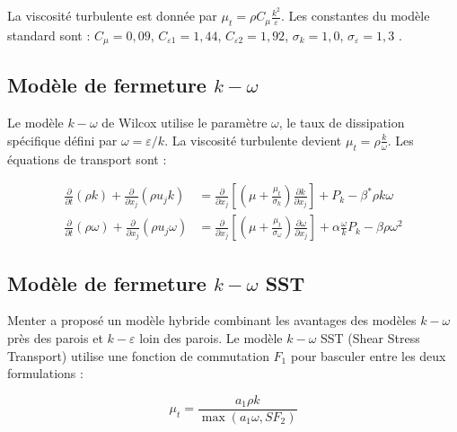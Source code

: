 La viscosité turbulente est donnée par \( \mu_t = \rho C_\mu \frac{k^2}{\varepsilon} \). Les constantes du modèle standard sont : \( C_\mu = 0,09 \), \( C_{\varepsilon 1} = 1,44 \), \( C_{\varepsilon 2} = 1,92 \), \( \sigma_k = 1,0 \), \( \sigma_\varepsilon = 1,3 \) \cite{launder1974numerical}.

\subsection{Modèle de fermeture \( k-\omega \)}
\label{subsec:modele_k_omega}

Le modèle \( k-\omega \) de Wilcox \cite{wilcox1988reassessment} utilise le paramètre \( \omega \), le taux de dissipation spécifique défini par \( \omega = \varepsilon/k \). La viscosité turbulente devient \( \mu_t = \rho \frac{k}{\omega} \). Les équations de transport sont \cite{wilcox2008formulation} :

\begin{align}
\frac{\partial}{\partial t} (\rho k) + \frac{\partial}{\partial x_j} (\rho u_j k) &= \frac{\partial}{\partial x_j} \left[ \left( \mu + \frac{\mu_t}{\sigma_k} \right) \frac{\partial k}{\partial x_j} \right] + P_k - \beta^* \rho k \omega \label{eq:transport_k_omega} \\
\frac{\partial}{\partial t} (\rho \omega) + \frac{\partial}{\partial x_j} (\rho u_j \omega) &= \frac{\partial}{\partial x_j} \left[ \left( \mu + \frac{\mu_t}{\sigma_\omega} \right) \frac{\partial \omega}{\partial x_j} \right] + \alpha \frac{\omega}{k} P_k - \beta \rho \omega^2 \label{eq:transport_omega}
\end{align}

\subsection{Modèle de fermeture \( k-\omega \) SST}
\label{subsec:modele_k_omega_sst}

Menter \cite{menter1994two} a proposé un modèle hybride combinant les avantages des modèles \( k-\omega \) près des parois et \( k-\varepsilon \) loin des parois. Le modèle \( k-\omega \) SST (Shear Stress Transport) utilise une fonction de commutation \( F_1 \) pour basculer entre les deux formulations \cite{menter2003ten} :

\begin{equation}
\mu_t = \frac{a_1 \rho k}{\max(a_1 \omega, S F_2)}
\label{eq:mu_t_sst}
\end{equation}

